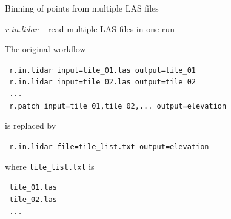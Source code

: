 \documentclass[xcolor={dvipsnames,usenames},beamer,aspectratio=1610]{beamer}
\newcommand{\gmodule}[1]{\href{http://grass.osgeo.org/grass71/manuals/#1.html}{\emph{#1}}}
\begin{document}
\begin{frame}{Binning of points from multiple LAS files}

\gmodule{r.in.lidar} -- read multiple LAS files in one run

\bigskip
\small

The original workflow

\smallskip

\texttt{ r.in.lidar input=tile\_01.las output=tile\_01}\\
\texttt{ r.in.lidar input=tile\_02.las output=tile\_02}\\
\texttt{ ...}\\
\texttt{ r.patch input=tile\_01,tile\_02,... output=elevation}\\

\smallskip

is replaced by

\smallskip

\alert{
\texttt{ r.in.lidar file=tile\_list.txt output=elevation}\\
}

\smallskip

where \texttt{tile\_list.txt} is

\smallskip

\texttt{ tile\_01.las}\\
\texttt{ tile\_02.las}\\
\texttt{ ...}\\

\end{frame}




\end{document}
